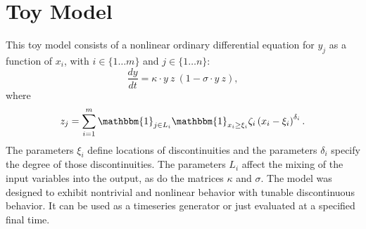 \documentclass[12pt]{article}
\begin{document}
\nocite{*}


\printbibliography


\appendix


\section{Toy Model}
\label{sec:toy}

This toy model consists of a nonlinear ordinary differential equation for $y_j$ as a function of $x_i$, with $i \in \{ 1 \ldots m \}$ and $j \in \{ 1 \ldots n \}$:
\begin{equation*}
    \frac{dy}{dt} = \kappa \cdot y \ z \ \left( 1 - \sigma \cdot y \  z \right) ,
\end{equation*}
where
\begin{equation*}
    z_j = \sum_{i=1}^m \mathbbm{1}_{j \in L_i} \mathbbm{1}_{x_i \ge \xi_i} \zeta_i \left( x_i - \xi_i \right)^{\delta_i} .
\end{equation*}
The parameters $\xi_i$ define locations of discontinuities and the parameters $\delta_i$ specify the degree of those discontinuities. The parameters $L_i$ affect the mixing of the input variables into the output, as do the matrices $\kappa$ and $\sigma$. The model was designed to exhibit nontrivial and nonlinear behavior with tunable discontinuous behavior. It can be used as a timeseries generator or just evaluated at a specified final time.
\end{document}

